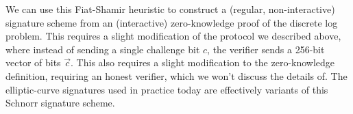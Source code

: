 We can use this Fiat-Shamir heuristic to construct a (regular,
non-interactive) signature scheme from an (interactive) zero-knowledge
proof of the discrete log problem.  This requires a slight modification
of the protocol we described above, where instead of sending a
single challenge bit $c$, the verifier sends a 256-bit vector of bits
$\overrightarrow{c}$.  This also requires a slight modification to the
zero-knowledge definition, requiring an honest verifier, which we won't
discuss the details of.  The elliptic-curve signatures used in practice
today are effectively variants of this Schnorr signature scheme.

